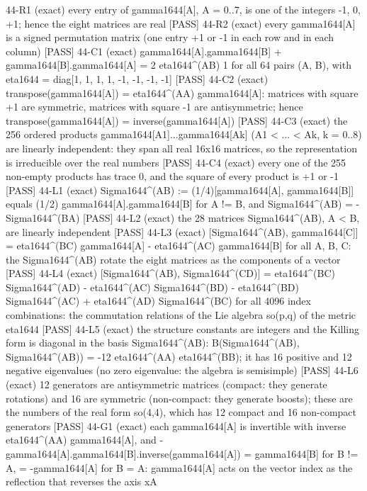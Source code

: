 \documentclass[
  10pt,
]{article}
\newenvironment{Shaded}{}{}
\newcommand{\NormalTok}[1]{#1}
\begin{document}
\begin{Shaded}
\begin{Highlighting}[]
\NormalTok{[PASS] 44{-}R1  (exact) every entry of gamma1644[A], A = 0..7, is one of the integers {-}1, 0, +1; hence the eight matrices are real}
\NormalTok{[PASS] 44{-}R2  (exact) every gamma1644[A] is a signed permutation matrix (one entry +1 or {-}1 in each row and in each column)}
\NormalTok{[PASS] 44{-}C1  (exact) gamma1644[A].gamma1644[B] + gamma1644[B].gamma1644[A] = 2 eta1644\^{}(AB) 1 for all 64 pairs (A, B), with eta1644 = diag[1, 1, 1, 1, {-}1, {-}1, {-}1, {-}1]}
\NormalTok{[PASS] 44{-}C2  (exact) transpose(gamma1644[A]) = eta1644\^{}(AA) gamma1644[A]: matrices with square +1 are symmetric, matrices with square {-}1 are antisymmetric; hence transpose(gamma1644[A]) = inverse(gamma1644[A])}
\NormalTok{[PASS] 44{-}C3  (exact) the 256 ordered products gamma1644[A1]...gamma1644[Ak] (A1 \textless{} ... \textless{} Ak, k = 0..8) are linearly independent: they span all real 16x16 matrices, so the representation is irreducible over the real numbers}
\NormalTok{[PASS] 44{-}C4  (exact) every one of the 255 non{-}empty products has trace 0, and the square of every product is +1 or {-}1}
\NormalTok{[PASS] 44{-}L1  (exact) Sigma1644\^{}(AB) := (1/4)[gamma1644[A], gamma1644[B]] equals (1/2) gamma1644[A].gamma1644[B] for A != B, and Sigma1644\^{}(AB) = {-}Sigma1644\^{}(BA)}
\NormalTok{[PASS] 44{-}L2  (exact) the 28 matrices Sigma1644\^{}(AB), A \textless{} B, are linearly independent}
\NormalTok{[PASS] 44{-}L3  (exact) [Sigma1644\^{}(AB), gamma1644[C]] = eta1644\^{}(BC) gamma1644[A] {-} eta1644\^{}(AC) gamma1644[B] for all A, B, C: the Sigma1644\^{}(AB) rotate the eight matrices as the components of a vector}
\NormalTok{[PASS] 44{-}L4  (exact) [Sigma1644\^{}(AB), Sigma1644\^{}(CD)] = eta1644\^{}(BC) Sigma1644\^{}(AD) {-} eta1644\^{}(AC) Sigma1644\^{}(BD) {-} eta1644\^{}(BD) Sigma1644\^{}(AC) + eta1644\^{}(AD) Sigma1644\^{}(BC) for all 4096 index combinations: the commutation relations of the Lie algebra so(p,q) of the metric eta1644}
\NormalTok{[PASS] 44{-}L5  (exact) the structure constants are integers and the Killing form is diagonal in the basis Sigma1644\^{}(AB): B(Sigma1644\^{}(AB), Sigma1644\^{}(AB)) = {-}12 eta1644\^{}(AA) eta1644\^{}(BB); it has 16 positive and 12 negative eigenvalues (no zero eigenvalue: the algebra is semisimple)}
\NormalTok{[PASS] 44{-}L6  (exact) 12 generators are antisymmetric matrices (compact: they generate rotations) and 16 are symmetric (non{-}compact: they generate boosts); these are the numbers of the real form so(4,4), which has 12 compact and 16 non{-}compact generators}
\NormalTok{[PASS] 44{-}G1  (exact) each gamma1644[A] is invertible with inverse eta1644\^{}(AA) gamma1644[A], and {-}gamma1644[A].gamma1644[B].inverse(gamma1644[A]) = gamma1644[B] for B != A, = {-}gamma1644[A] for B = A: gamma1644[A] acts on the vector index as the reflection that reverses the axis xA}

\end{Highlighting}
\end{Shaded}
\end{document}
